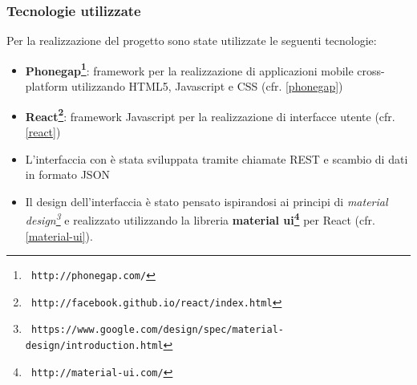 \subsubsection{Tecnologie utilizzate}
Per la realizzazione del progetto sono state utilizzate le seguenti tecnologie:

\begin{itemize}
\item \textbf{Phonegap\footnote{\texttt{ http://phonegap.com/}}}: framework per 
la realizzazione di applicazioni mobile
cross-platform utilizzando HTML5, Javascript e CSS (cfr. \ref{phonegap})
\item \textbf{React\footnote{\texttt{ http://facebook.github.io/react/index.html}}}: 
framework Javascript per la realizzazione di interfacce utente (cfr. \ref{react})
\item L'interfaccia con \fiscoloWeb{} è stata sviluppata tramite chiamate REST e
scambio di dati in formato JSON
\item Il design dell'interfaccia è stato pensato ispirandosi ai principi di
\textit{material design\footnote{\texttt{ https://www.google.com/design/spec/material-design/introduction.html}}} e 
realizzato utilizzando la libreria \textbf{material ui\footnote{\texttt{ http://material-ui.com/}}} per React (cfr. \ref{material-ui}).
\end{itemize}


